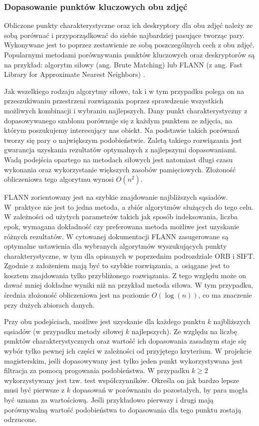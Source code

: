 \subsubsection{Dopasowanie punktów kluczowych obu zdjęć} \label{sec:feature_matching_matching}

Obliczone punkty charakterystyczne oraz ich deskryptory dla obu zdjęć należy ze sobą porównać i przyporządkować do siebie najbardziej pasujące tworząc pary. Wykonywane jest to poprzez zestawienie ze sobą poszczególnych cech z obu zdjęć. Popularnymi metodami porównywania punktów kluczowych oraz deskryptorów są na przykład: algorytm siłowy (ang. Brute Matching) lub FLANN (z ang. Fast Library for Approximate Nearest Neighbors) \cite{opencv_matching}\cite{feature_unik}.

Jak wszelkiego rodzaju algorytmy siłowe, tak i w tym przypadku polega on na przeszukiwaniu przestrzeni rozwiązania poprzez sprawdzenie wszystkich możliwych kombinacji i wybraniu najlepszych. Dany punkt charakterystyczny z dopasowywanego szablonu porównuje się z każdym punktem ze zdjęcia, na którym poszukujemy interesujący nas obiekt. Na podstawie takich porównań tworzy się pary o największym podobieństwie. Zaletą takiego rozwiązania jest gwarancja uzyskania rezultatów optymalnych z najlepszymi dopasowaniami. Wadą podejścia opartego na metodach siłowych jest natomiast długi czasu wykonania oraz wykorzystanie większych zasobów pamięciowych. Złożoność obliczeniowa tego algorytmu wynosi $O(n^2)$.

FLANN \cite{FLANN} \cite{FLANN_manual} zorientowany jest na szybkie znajdowanie najbliższych sąsiadów. W~praktyce nie jest to jedna metoda, a zbiór algorytmów służących do tego celu. W zależności od użytych parametrów takich jak sposób indeksowania, liczba epok, wymagana dokładność czy preferowana metoda możliwe jest uzyskanie różnych rezultatów. W cytowanej dokumentacji FLANN zasugerowane są optymalne ustawienia dla wybranych algorytmów wyszukujących punkty charakterystyczne, w tym dla opisanych w poprzednim podrozdziale ORB i SIFT. Zgodnie z założeniem mają być to szybkie rozwiązania, a~osiągane jest to kosztem znajdowania tylko przybliżonego rozwiązania. Z tego względu może on dawać mniej dokładne wyniki niż na przykład metoda siłowa. W tym przypadku, średnia złożoność obliczeniowa jest na poziomie $O(\log(n))$, co ma znaczenie przy dużych zbiorach danych. 

Przy obu podejściach, możliwe jest uzyskanie dla każdego punktu $k$ najbliższych sąsiadów (w przypadku metody siłowej $k$ najlepszych). Ze względu na liczbę punktów charakterystycznych oraz wartość ich dopasowania zasadnym staje się wybór tylko pewnej ich części w zależności od przyjętego kryterium. W projekcie magisterskim, jeśli dopasowywany jest tylko jeden punkt wykorzystywana jest filtracja za pomocą progowania podobieństwa. W przypadku $k\geq2$ wykorzystywany jest tzw. test współczynników. Określa on jak bardzo lepsze musi być pierwsze z $k$ dopasowań w porównaniu do pozostałych, by para mogła być uznana za wartościową. Jeśli przykładowo pierwszy i drugi mają porównywalną wartość podobieństwa to dopasowania dla tego punktu zostają odrzucone. 

